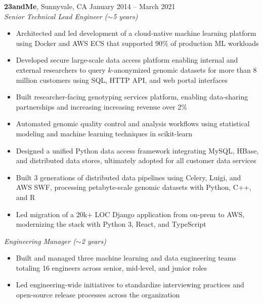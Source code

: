 \documentclass[margin,line]{resume}
\begin{document}
\begin{resume}
    \textbf{23andMe}, Sunnyvale, CA \hfill\vspace{1mm}\hfill January 2014 -- March 2021\\%
    \textsl{Senior Technical Lead Engineer (\(\sim\)5 years)}
    \begin{itemize}
    \item Architected and led development of a cloud-native machine learning platform using Docker and AWS ECS that supported 90\% of production ML workloads
    \item Developed secure large-scale data access platform enabling internal and external researchers to query \(k\)-anonymized genomic datasets for more than 8 million customers using SQL, HTTP API, and web portal interfaces
    \item Built researcher-facing genotyping services platform, enabling data-sharing partnerships and increasing increasing revenue over 2\%
    \newpage
    \item Automated genomic quality control and analysis workflows using statistical modeling and machine learning techniques in scikit-learn
    \item Designed a unified Python data access framework integrating MySQL, HBase, and distributed data stores, ultimately adopted for all customer data services
    \item Built 3 generations of distributed data pipelines using Celery, Luigi, and AWS SWF, processing petabyte-scale genomic datasets with Python, C++, and R
    \item Led migration of a 20k+ LOC Django application from on-prem to AWS, modernizing the stack with Python 3, React, and TypeScript
    \end{itemize}
    \textsl{Engineering Manager (\(\sim\)2 years)}
    \begin{itemize}
    \item Built and managed three machine learning and data engineering teams totaling 16 engineers across senior, mid-level, and junior roles
    \item Led engineering-wide initiatives to standardize interviewing practices and open-source release processes across the organization
    \end{itemize}
    


\end{resume}
\end{document}
